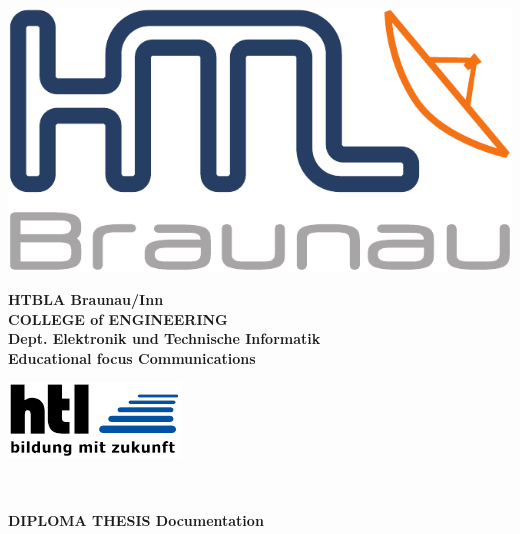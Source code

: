 \begin{minipage}[c]{0.20\linewidth}
\includegraphics[width=0.8\linewidth]{media/images/htl_c_cmyk_rein}
\end{minipage}
\begin{minipage}[c]{0.6\linewidth}
\begin{center}
{\bfseries\sffamily\large HTBLA Braunau/Inn\\
COLLEGE of ENGINEERING\\
Dept. Elektronik und Technische Informatik\\
{\normalsize Educational focus Communications} }
\end{center}
\end{minipage}
\begin{minipage}[c]{0.2\linewidth}
\hfill \includegraphics[width=0.8\linewidth]{media/images/htl-bildung-mit-zukunft}
\end{minipage}\\

\vspace{1em}
\begin{center}
\bfseries\sffamily\Large
DIPLOMA THESIS Documentation
\end{center}
\vspace{1ex}

